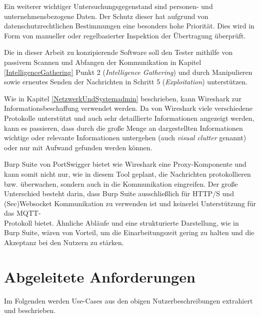     Ein weiterer wichtiger Untersuchungsgegenstand sind personen- und unternehmensbezogene Daten. Der Schutz dieser hat aufgrund von datenschutzrechtlichen Bestimmungen eine besonders hohe Priorität. Dies wird in Form von manueller oder regelbasierter Inspektion der Übertragung überprüft.
    
    
    Die in dieser Arbeit zu konzipierende Software soll den Tester mithilfe von passivem Scannen und Abfangen der Kommunikation in Kapitel \ref{IntelligenceGathering} Punkt 2 (\emph{Intelligence Gathering}) und durch Manipulieren sowie erneutes Senden der Nachrichten in Schritt 5 (\emph{Exploitation}) unterstützen.
    
    Wie in Kapitel \ref{NetzwerkUndSystemadmin} beschrieben, kann Wireshark zur Informationsbeschaffung verwendet werden.
    Da von Wireshark viele verschiedene Protokolle unterstützt und auch sehr detaillierte Informationen angezeigt werden, kann es passieren, dass durch die große Menge an dargestellten Informationen wichtige oder relevante Informationen untergehen (auch \emph{visual clutter} genannt) oder nur mit Aufwand gefunden werden können.
    
    Burp Suite von PortSwigger bietet wie Wireshark eine Proxy-Komponente und kann somit nicht nur, wie in diesem Tool geplant, die Nachrichten protokollieren bzw. überwachen, sondern auch in die Kommunikation eingreifen. Der große Unterschied besteht darin, dass Burp Suite ausschließlich für HTTP/S und (Sec)Websocket Kommunikation zu verwenden ist und keinerlei Unterstützung für das \ac{MQTT}- \\ Protokoll bietet. Ähnliche Abläufe und eine strukturierte Darstellung, wie in Burp Suite, wären von Vorteil, um die Einarbeitungszeit gering zu halten und die Akzeptanz bei den Nutzern zu stärken.

\section{Abgeleitete Anforderungen}
    Im Folgenden werden Use-Cases aus den obigen Nutzerbeschreibungen extrahiert und beschrieben.
